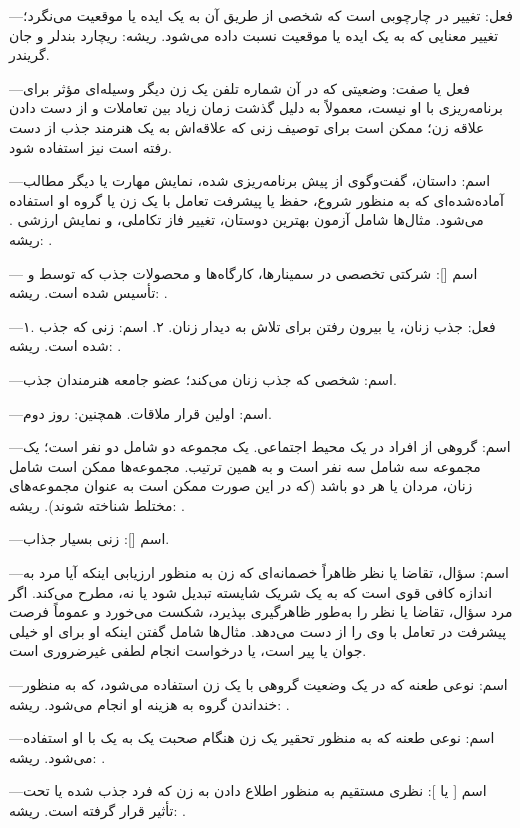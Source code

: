 —فعل: تغییر در چارچوبی است که شخصی از طریق آن به یک ایده یا موقعیت می‌نگرد؛ تغییر معنایی که به یک ایده یا موقعیت نسبت داده می‌شود. 
ریشه: ریچارد بندلر و جان گریندر.

—فعل یا صفت: وضعیتی که در آن شماره تلفن یک زن دیگر وسیله‌ای مؤثر برای برنامه‌ریزی با او نیست، معمولاً به دلیل گذشت زمان زیاد بین تعاملات و از دست دادن علاقه زن؛ ممکن است برای توصیف زنی که علاقه‌اش به یک هنرمند جذب از دست رفته است نیز استفاده شود.

—اسم: داستان، گفت‌وگوی از پیش برنامه‌ریزی شده، نمایش مهارت یا دیگر مطالب آماده‌شده‌ای که به منظور شروع، حفظ یا پیشرفت تعامل با یک زن یا گروه او استفاده می‌شود. مثال‌ها شامل آزمون بهترین دوستان، تغییر فاز تکاملی، و نمایش ارزشی . ریشه: .

— اسم []: شرکتی تخصصی در سمینارها، کارگاه‌ها و محصولات جذب که توسط  و  تأسیس شده است. ریشه: .

—۱. فعل: جذب زنان، یا بیرون رفتن برای تلاش به دیدار زنان. ۲. اسم: زنی که جذب شده است. ریشه: .

—اسم: شخصی که جذب زنان می‌کند؛ عضو جامعه هنرمندان جذب.

—اسم: اولین قرار ملاقات. همچنین: روز دوم.

—اسم: گروهی از افراد در یک محیط اجتماعی. یک مجموعه دو شامل دو نفر است؛ یک مجموعه سه شامل سه نفر است و به همین ترتیب. مجموعه‌ها ممکن است شامل زنان، مردان یا هر دو باشد (که در این صورت ممکن است به عنوان مجموعه‌های مختلط شناخته شوند). ریشه: .

—اسم []: زنی بسیار جذاب.

—اسم: سؤال، تقاضا یا نظر ظاهراً خصمانه‌ای که زن به منظور ارزیابی اینکه آیا مرد به اندازه کافی قوی است که به یک شریک شایسته تبدیل شود یا نه، مطرح می‌کند. اگر مرد سؤال، تقاضا یا نظر را به‌طور ظاهرگیری بپذیرد، شکست می‌خورد و عموماً فرصت پیشرفت در تعامل با وی را از دست می‌دهد. مثال‌ها شامل گفتن اینکه او برای او خیلی جوان یا پیر است، یا درخواست انجام لطفی غیرضروری است.

—اسم: نوعی طعنه که در یک وضعیت گروهی با یک زن استفاده می‌شود، که به منظور خنداندن گروه به هزینه او انجام می‌شود. ریشه: .

—اسم: نوعی طعنه که به منظور تحقیر یک زن هنگام صحبت یک به یک با او استفاده می‌شود. ریشه: .

—اسم [ یا ]: نظری مستقیم به منظور اطلاع دادن به زن که فرد جذب شده یا تحت تأثیر قرار گرفته است. ریشه: .

